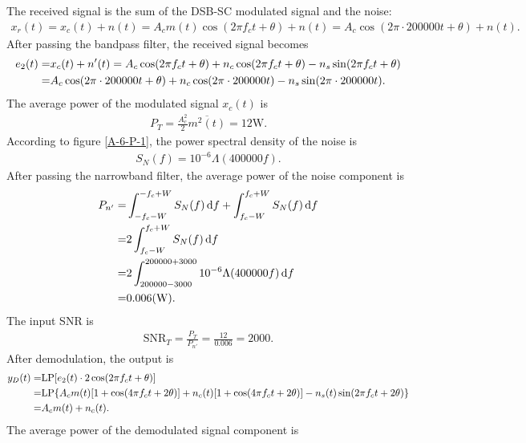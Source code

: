\documentclass{assignment}
\begin{document}
\begin{sol}
    The received signal is the sum of the DSB-SC modulated signal and the noise:
    \begin{align}
        x_r(t)=x_c(t)+n(t)=A_cm(t)\cos(2\pi f_ct+\theta)+n(t)=A_c\cos(2\pi\cdot 200000t+\theta)+n(t).
    \end{align}
    After passing the bandpass filter, the received signal becomes
    \begin{align}
        \notag e_2(t)=&x_c(t)+n'(t)=A_c\cos(2\pi f_ct+\theta)+n_c\cos(2\pi f_ct+\theta)-n_s\sin(2\pi f_ct+\theta)\\
        =&A_c\cos(2\pi\cdot 200000t+\theta)+n_c\cos(2\pi\cdot 200000t)-n_s\sin(2\pi\cdot 200000t).
    \end{align}
    The average power of the modulated signal $x_c(t)$ is
    \begin{align}
        P_T=\frac{A_c^2}{2}\overline{m^2(t)}=12\mathrm{W}.
    \end{align}
    According to figure \ref{A-6-P-1}, the power spectral density of the noise is
    \begin{align}
        S_N(f)=10^{-6}\Lambda(400000f).
    \end{align}
    After passing the narrowband filter, the average power of the noise component is
    \begin{align}
        \notag P_{n'}=&\int_{-f_c-W}^{-f_c+W}S_N(f)\,\mathrm{d}f+\int_{f_c-W}^{f_c+W}S_N(f)\,\mathrm{d}f\\
        \notag=&2\int_{f_c-W}^{f_c+W}S_N(f)\,\mathrm{d}f\\
        \notag=&2\int_{200000-3000}^{200000+3000}10^{-6}\Lambda(400000f)\,\mathrm{d}f\\
        =&0.006(\mathrm{W}).
    \end{align}
    The input SNR is
    \begin{align}
        \text{SNR}_T=\frac{P_T}{P_{n'}}=\frac{12}{0.006}=2000.
    \end{align}
    After demodulation, the output is
    \begin{align}
        \notag y_D(t)=&\text{LP}[e_2(t)\cdot 2\cos(2\pi f_ct+\theta)]\\
        \notag=&\text{LP}\{A_cm(t)[1+\cos(4\pi f_ct+2\theta)]+n_c(t)[1+\cos(4\pi f_ct+2\theta)]-n_s(t)\sin(2\pi f_ct+2\theta)\}\\
        \notag=&A_cm(t)+n_c(t).
    \end{align}
    The average power of the demodulated signal component is
    \begin{align}

\end{align}
\end{sol}
\end{document}
